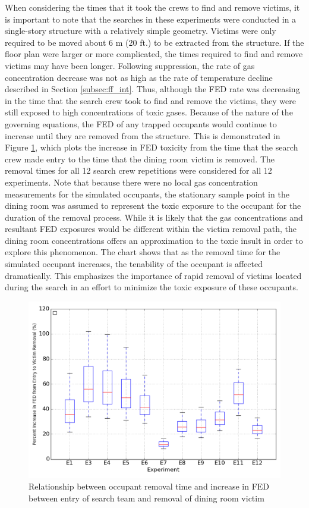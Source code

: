 \documentclass[12pt,oneside]{article}
\begin{document}
When considering the times that it took the crews to find and remove victims, it is important to note that the searches in these experiments were conducted in a single-story structure with a relatively simple geometry. Victims were only required to be moved about 6 m (20 ft.) to be extracted from the structure. If the floor plan were larger or more complicated, the times required to find and remove victims may have been longer. Following suppression, the rate of gas concentration decrease was not as high as the rate of temperature decline described in Section \ref{subsec:ff_int}. Thus, although the FED rate was decreasing in the time that the search crew took to find and remove the victims, they were still exposed to high concentrations of toxic gases. Because of the nature of the governing equations, the FED of any trapped occupants would continue to increase until they are removed from the structure. This is demonstrated in Figure \ref{fig:vic_removal}, which plots the increase in FED toxicity from the time that the search crew made entry to the time that the dining room victim is removed. The removal times for all 12 search crew repetitions were considered for all 12 experiments. Note that because there were no local gas concentration measurements for the simulated occupants, the stationary sample point in the dining room was assumed to represent the toxic exposure to the occupant for the duration of the removal process. While it is likely that the gas concentrations and resultant FED exposures would be different within the victim removal path, the dining room concentrations offers an approximation to the toxic insult in order to explore this phenomenon. The chart shows that as the removal time for the simulated occupant increases, the tenability of the occupant is affected dramatically. This emphasizes the importance of rapid removal of victims located during the search in an effort to minimize the toxic exposure of these occupants. 

\begin{figure}[!ht]
	\centering
	\includegraphics[width=.75\textwidth]{../Figures/victim_removal/V1}
	\caption[Relationship between occupant removal time and increase in FED between entry of search team and removal of dining room victim]{Relationship between occupant removal time and increase in FED between entry of search team and removal of dining room victim}
	\label{fig:vic_removal}
\end{figure}
\end{document}
